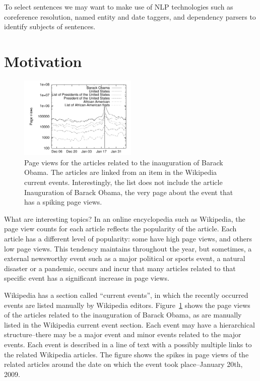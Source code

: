 \documentclass[11pt]{article}
\newcommand{\war}[1]{{\sf\small #1}}
\begin{document}
To select sentences we may want to make use of NLP technologies such as coreference resolution, named entity and date taggers, and dependency parsers to identify subjects of sentences.

\section{Motivation}

\begin{figure}
\centering
\includegraphics[width=0.5\textwidth]{figures/obama.pdf}
\caption{Page views for the articles related to the inauguration of Barack Obama. The articles are linked from an item in the Wikipedia current events. Interestingly, the list does not include the article \war{Inauguration of Barack Obama}, the very page about the event that has a spiking page views.}
\label{fig:obama-sparkline}
\end{figure}

What are interesting topics? In an online encyclopedia such as Wikipedia, the page view counts for each article reflects the popularity of the article. Each article has a different level of popularity: some have high page views, and others low page views. This tendency maintains throughout the year, but sometimes, a external newsworthy event such as a major political or sports event, a natural disaster or a pandemic, occurs and incur that many articles related to that specific event has a significant increase in page views.

Wikipedia has a section called ``current events'', in which the recently occurred events are listed manually by Wikipedia editors.
Figure~\ref{fig:obama-sparkline} shows the page views of the articles related to the inauguration of Barack Obama, as are manually listed in the Wikipedia current event section.
Each event may have a hierarchical structure--there may be a major event and minor events related to the major events.
Each event is described in a line of text with a possibly multiple links to the related Wikipedia articles.
The figure shows the spikes in page views of the related articles around the date on which the event took place--January 20th, 2009.
\end{document}
